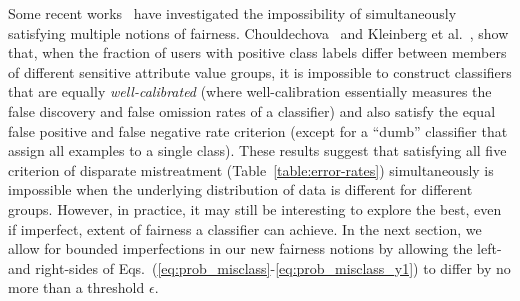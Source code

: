 \documentclass[letterpaper]{sig-alternate-2013}
\newcommand{\disc}{disparate mistreatment}
\begin{document}
Some recent works~\cite{dimpact_fpr,kleinberg_itcs16} have
investigated the impossibility of simultaneously satisfying multiple notions of
fairness.
Chouldechova~\cite{dimpact_fpr} and Kleinberg et
al.~\cite{kleinberg_itcs16}, show that, when the fraction of users
with positive class labels differ between members of different
sensitive attribute value groups, it is impossible to construct
classifiers that are equally {\it well-calibrated} (where
well-calibration essentially measures the false discovery and false omission
rates of a classifier) and also satisfy the equal false positive and
false negative rate criterion (except for a ``dumb'' classifier that
assign all examples to a single class).  These results suggest that
satisfying all five criterion of \disc{}
(Table~\ref{table:error-rates}) simultaneously is impossible when the underlying
distribution of data is different for different groups. However,
in practice, it may still be interesting to explore the best, even if
imperfect, extent of fairness a classifier can achieve. In the next
section, we allow for bounded imperfections in our new fairness
notions by allowing the left- and right-sides of
Eqs.~(\ref{eq:prob_misclass}-\ref{eq:prob_misclass_y1}) to differ
by no more than a threshold $\epsilon$.

































\vspace{-2mm}
\end{document}
